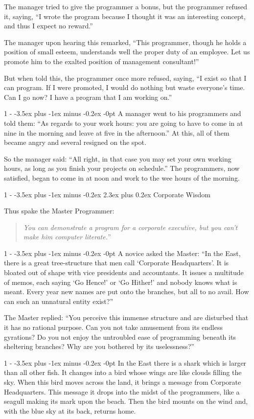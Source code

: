 \documentclass[12pt,letterpaper,titlepage]{article}
\makeatletter
\newlength{\intomargin}\setlength{\intomargin}{25pt}
\renewcommand{\section}{%
\@startsection{section}%
{1}%
{-\intomargin}%
{-3.5ex plus -1ex minus -0.2ex}%
{2.3ex plus 0.2ex}%
{\clearpage\normalfont\Large\bfseries\color{my-red}}%
}
\renewcommand{\subsection}{%
\@startsection{subsection}%
{1}%
{-\intomargin}%
{-3.5ex plus -1ex minus -0.2ex}%
{-0pt}%
{\normalfont\normalsize\bfseries\color{my-red}}%
}
\newcommand{\book}[2]{\section{#1}%
\par\hspace{-\intomargin}Thus spake the Master Programmer:%
\begin{quotation}\color{my-gray}\noindent\llap{``}\textsl{#2}''\end{quotation}\medskip}
\newcommand{\sect}{\subsection{}}
\makeatother
\begin{document}
The manager tried to give the programmer a bonus, but the programmer
refused it, saying, ``I wrote the program because I thought it was an
interesting concept, and thus I expect no reward.''

The manager upon hearing this remarked, ``This programmer, though he
holds a position of small esteem, understands well the proper duty of
an employee. Let us promote him to the exalted position of management
consultant!''

But when told this, the programmer once more refused, saying, ``I
exist so that I can program. If I were promoted, I would do nothing
but waste everyone's time. Can I go now? I have a program that I am
working on.''

\sect
A manager went to his programmers and told them: ``As regards to your
work hours: you are going to have to come in at nine in the morning
and leave at five in the afternoon.'' At this, all of them became
angry and several resigned on the spot.

So the manager said: ``All right, in that case you may set your own
working hours, as long as you finish your projects on schedule.'' The
programmers, now satisfied, began to come in at noon and work to the
wee hours of the morning.

\book{Corporate Wisdom}%
{You can demonstrate a program for a corporate executive,
but you can't make him computer literate.}

\sect
A novice asked the Master: ``In the East, there is a great
tree-structure that men call `Corporate Headquarters'. It is bloated
out of shape with vice presidents and accountants. It issues a
multitude of memos, each saying `Go Hence!' or `Go Hither!' and nobody
knows what is meant. Every year new names are put onto the branches,
but all to no avail. How can such an unnatural entity exist?''

The Master replied: ``You perceive this immense structure and are
disturbed that it has no rational purpose. Can you not take amusement
from its endless gyrations? Do you not enjoy the untroubled ease of
programming beneath its sheltering branches? Why are you bothered by
its uselessness?''

\sect
In the East there is a shark which is larger than all other fish. It
changes into a bird whose wings are like clouds filling the sky. When
this bird moves across the land, it brings a message from Corporate
Headquarters. This message it drops into the midst of the programmers,
like a seagull making its mark upon the beach. Then the bird mounts on
the wind and, with the blue sky at its back, returns home.
\end{document}
